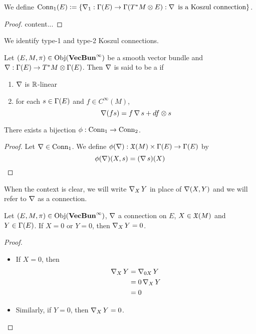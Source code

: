 \documentclass{book}
\begin{document}
	\begin{ex}
		We define $\text{Conn}_1(E) \vcentcolon= \{\operatorname{\nabla}_1 : \Gamma(E) \rightarrow \Gamma(T^*M \otimes E): \operatorname{\nabla} \text{ is a Koszul connection}\}$.
	\end{ex}

	\begin{proof}
		content...
	\end{proof}

	\begin{note}
		We identify type-1 and type-2 Koszul connections.	
	\end{note}

	\begin{defn}
		Let $(E, M, \pi) \in \operatorname{Obj}(\operatorname*{\text{\textbf{VecBun}}^{\infty}})$ be a smooth vector bundle and $\operatorname{\nabla} : \Gamma(E) \rightarrow T^*M \otimes \Gamma(E)$. Then $\operatorname{\nabla}$ is said to be a  if 
		\begin{enumerate}
			\item $\operatorname{\nabla}$ is $\mathbb{R}$-linear
			\item for each $s \in \Gamma(E)$ and $f \in C^{\infty}(M)$, 
			$$\operatorname{\nabla}(fs) = f \operatorname{\nabla} s + df \otimes s $$ 
		\end{enumerate}
	\end{defn}

	\begin{ex}
		There exists a bijection $\phi:  \text{Conn}_1 \rightarrow \text{Conn}_2$.
	\end{ex}

	\begin{proof}
		Let $\operatorname{\nabla} \in \text{Conn}_1$. We define $\phi(\operatorname{\nabla}): \mathfrak{X}(M) \times \Gamma(E) \rightarrow \Gamma(E)$ by $$\phi(\operatorname{\nabla})(X, s) = (\operatorname{\nabla} s)(X)$$
	\end{proof}

	\begin{note}
		When the context is clear, we will write $\operatorname{\nabla}_X Y$ in place of $\operatorname{\nabla}(X,Y)$ and we will refer to $\operatorname{\nabla}$ as a connection.
	\end{note}

	\begin{ex}
		Let $(E, M, \pi) \in \operatorname{Obj}(\operatorname*{\text{\textbf{VecBun}}^{\infty}})$, $\operatorname{\nabla}$ a connection on $E$, $X \in \mathfrak{X}(M)$ and $Y \in \Gamma(E)$. If $X = 0$ or $Y = 0$, then $\operatorname{\nabla}_X Y = 0$.
	\end{ex}

	\begin{proof}\
		\begin{itemize}
			\item If $X = 0$, then 
			\begin{align*}
				\operatorname{\nabla}_X Y
				& = \operatorname{\nabla}_{0 X} Y \\
				& = 0 \operatorname{\nabla}_X Y \\
				& = 0
			\end{align*}
			\item Similarly, if $Y = 0$, then $\operatorname{\nabla}_X Y = 0$.
		\end{itemize}
	\end{proof}
\end{document}
